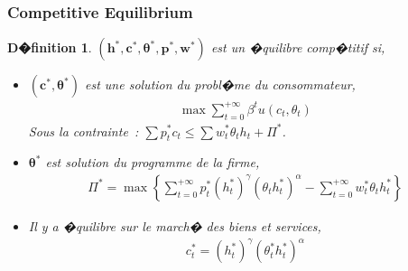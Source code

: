 \documentclass[10pt, hyperref={pdfpagemode=FullScreen}]{beamer} %
\newtheorem{d�finition}[theorem]{D�finition}
\begin{document}
\begin{frame}
\frametitle{Competitive Equilibrium}
\begin{d�finition}
\scriptsize{
$(\mathbf{h^{*}},\mathbf{c^{*}},\mathbf{\theta^{*}},\mathbf{p^{*}},\mathbf{w^{*}})$ est un �quilibre comp�titif si,
\begin{itemize}
\item<2-| alert@2> $(\mathbf{c^{*}},\mathbf{\theta^{*}})$ est une solution du probl�me du consommateur,
\begin{eqnarray*}
\max\sum_{t=0}^{+\infty}\beta^{t} u(c_{t},\theta_{t})
\end{eqnarray*}
Sous la contrainte~: $\sum p_{t}^{*}c_{t}\leq \sum w_{t}^{*}\theta_{t}h_{t}+\Pi^{*}$.
\item<3-| alert@3> $\mathbf{\theta^{*}}$ est solution du programme de la firme,
\begin{eqnarray*}
\Pi^{*} = \max\left\{\sum_{t=0}^{+\infty}p_{t}^{*}(h_{t}^{*})^{\gamma}(\theta_{t}h_{t}^{*})^{\alpha}-\sum_{t=0}^{+\infty}w_{t}^{*}\theta_{t}h_{t}^{*}\right\}
\end{eqnarray*}
\item<4-| alert@4> Il y a �quilibre sur le march� des biens et services, 
\begin{eqnarray*}
c_{t}^{*} = (h_{t}^{*})^{\gamma} (\theta_{t}^{*}h_{t}^{*})^{\alpha}
\end{eqnarray*}
\end{itemize}
}
\end{d�finition}
\end{frame}
\end{document}
